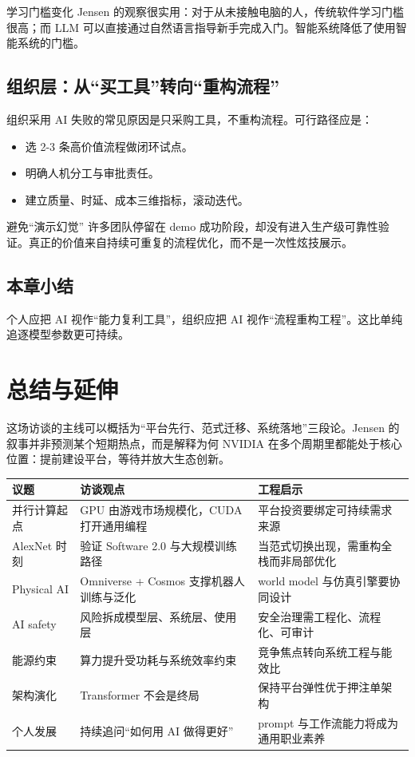 \documentclass[a4paper]{article}
\begin{document}
\begin{importantbox}{学习门槛变化}
Jensen 的观察很实用：对于从未接触电脑的人，传统软件学习门槛很高；而 LLM 可以直接通过自然语言指导新手完成入门。智能系统降低了使用智能系统的门槛。
\end{importantbox}

\subsection{组织层：从“买工具”转向“重构流程”}

组织采用 AI 失败的常见原因是只采购工具，不重构流程。可行路径应是：
\begin{itemize}
    \item 选 2-3 条高价值流程做闭环试点。
    \item 明确人机分工与审批责任。
    \item 建立质量、时延、成本三维指标，滚动迭代。
\end{itemize}

\begin{warningbox}{避免“演示幻觉”}
许多团队停留在 demo 成功阶段，却没有进入生产级可靠性验证。真正的价值来自持续可重复的流程优化，而不是一次性炫技展示。
\end{warningbox}

\subsection{本章小结}
个人应把 AI 视作“能力复利工具”，组织应把 AI 视作“流程重构工程”。这比单纯追逐模型参数更可持续。

\section{总结与延伸}

这场访谈的主线可以概括为“平台先行、范式迁移、系统落地”三段论。Jensen 的叙事并非预测某个短期热点，而是解释为何 NVIDIA 在多个周期里都能处于核心位置：提前建设平台，等待并放大生态创新。

\begin{longtable}{p{} p{} p{}}
\toprule
\textbf{议题} & \textbf{访谈观点} & \textbf{工程启示} \\
\midrule
并行计算起点 & GPU 由游戏市场规模化，CUDA 打开通用编程 & 平台投资要绑定可持续需求来源 \\
\midrule
AlexNet 时刻 & 验证 Software 2.0 与大规模训练路径 & 当范式切换出现，需重构全栈而非局部优化 \\
\midrule
Physical AI & Omniverse + Cosmos 支撑机器人训练与泛化 & world model 与仿真引擎要协同设计 \\
\midrule
AI safety & 风险拆成模型层、系统层、使用层 & 安全治理需工程化、流程化、可审计 \\
\midrule
能源约束 & 算力提升受功耗与系统效率约束 & 竞争焦点转向系统工程与能效比 \\
\midrule
架构演化 & Transformer 不会是终局 & 保持平台弹性优于押注单架构 \\
\midrule
个人发展 & 持续追问“如何用 AI 做得更好” & prompt 与工作流能力将成为通用职业素养 \\
\bottomrule
\end{longtable}
\end{document}
